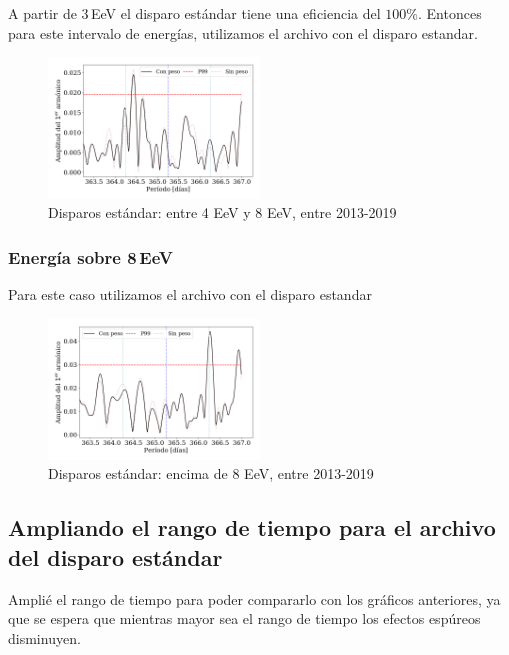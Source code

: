 A partir de $3\,$EeV el disparo estándar tiene una eficiencia del $100\%$. Entonces para este  intervalo de energías,  utilizamos el archivo con el disparo estandar.

\begin{figure}[H]
	\centering
	\includegraphics[width=0.5\textwidth]{2019_Main_Array_4_8_EeV_con_vs_sin_peso.png}
	\caption{Disparos estándar: entre 4 EeV y 8 EeV, entre 2013-2019}
	\label{fig:48w}
\end{figure}

\subsubsection{Energía sobre 8\,EeV}

Para este caso utilizamos el archivo con el disparo estandar

\begin{figure}[H]
	\centering
	\includegraphics[width=0.5\textwidth]{2019_Main_Array_8_EeV_con_vs_sin_peso.png}
	\caption{Disparos estándar: encima de 8 EeV, entre 2013-2019}
	\label{fig:8w}
\end{figure}




\subsection{Ampliando el rango de tiempo para el archivo del disparo estándar}

Amplié el rango de tiempo para poder compararlo con los gráficos anteriores, ya que se espera que mientras mayor sea el rango de tiempo los efectos espúreos disminuyen.

